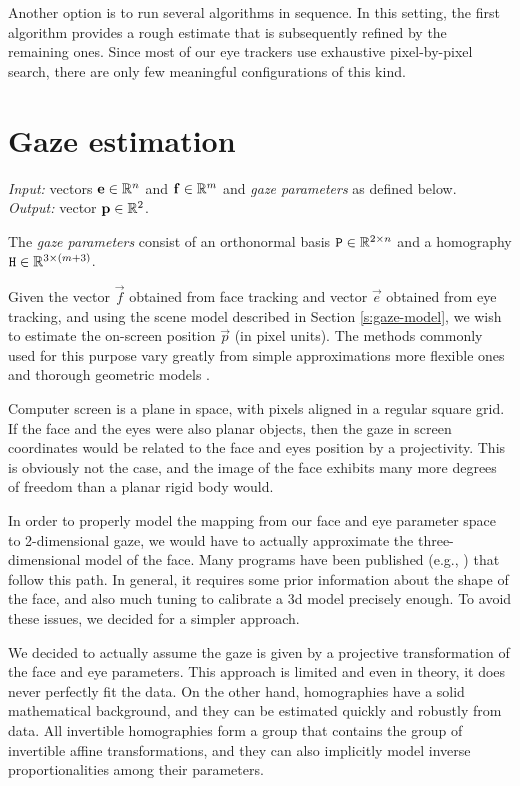 Another option is to run several algorithms in sequence.
In this setting, the first algorithm provides a rough estimate that is subsequently refined by the remaining ones.
Since most of our eye trackers use exhaustive pixel-by-pixel search, there are only few meaningful configurations of this kind.

\section{Gaze estimation}
\label{s:impl-gaze}

\textit{Input:} vectors $\mathbf{e} \in \mathbb{R}^n$ and $\mathbf{f} \in \mathbb{R}^m$ and \textit{gaze parameters} as defined below.\\
\textit{Output:} vector $\mathbf{p} \in \mathbb{R}^2$.\\

\begin{definition} \label{d:gaze-parameters}
The \textit{gaze parameters} consist of an orthonormal basis $\mathtt{P} \in \mathbb{R}^{2\times n}$ and a homography $\mathtt{H} \in \mathbb{R}^{3 \times (m+3)}$.
\end{definition}

Given the vector $\vec f$ obtained from face tracking and vector $\vec e$ obtained from eye tracking, and using the scene model described in Section \ref{s:gaze-model}, we wish to estimate the on-screen position $\vec p$ (in pixel units).
The methods commonly used for this purpose vary greatly from simple approximations \cite{zhu12} more flexible ones \cite{kassner14,yucel09} and thorough geometric models \cite{villanueva08,wang16}.

Computer screen is a plane in space, with pixels aligned in a regular square grid.
If the face and the eyes were also planar objects, then the gaze in screen coordinates would be related to the face and eyes position by a projectivity.
This is obviously not the case, and the image of the face exhibits many more degrees of freedom than a planar rigid body would.
 
In order to properly model the mapping from our face and eye parameter space to 2-dimensional gaze, we would have to actually approximate the three-dimensional model of the face.
Many programs have been published (e.g., \cite{fanelli11}) that follow this path.
In general, it requires some prior information about the shape of the face, and also much tuning to calibrate a 3d model precisely enough.
To avoid these issues, we decided for a simpler approach.

We decided to actually assume the gaze is given by a projective transformation of the face and eye parameters.
This approach is limited and even in theory, it does never perfectly fit the data.
On the other hand, homographies have a solid mathematical background, and they can be estimated quickly and robustly from data.
All invertible homographies form a group that contains the group of invertible affine transformations, and they can also implicitly model inverse proportionalities among their parameters.

